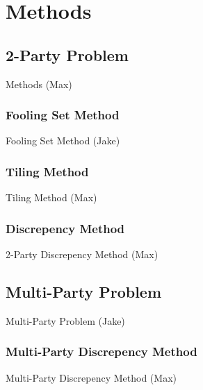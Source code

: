 \documentclass{beamer}
\begin{document}
\section{Methods}

\subsection{2-Party Problem}

\begin{frame}{Methods (Max)}

\end{frame}

\subsubsection{Fooling Set Method}

\begin{frame}{Fooling Set Method (Jake)}
\TODO
\end{frame}

\subsubsection{Tiling Method}

\begin{frame}{Tiling Method (Max)}
\TODO
\end{frame}

\subsubsection{Discrepency Method}

\begin{frame}{2-Party Discrepency Method (Max)}
\TODO
\end{frame}

\subsection{Multi-Party Problem}

\begin{frame}{Multi-Party Problem (Jake)}
\TODO
\end{frame}

\subsubsection{Multi-Party Discrepency Method}

\begin{frame}{Multi-Party Discrepency Method (Max)}
\TODO
\end{frame}
\end{document}

